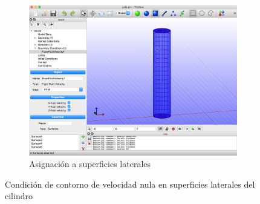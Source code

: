 \begin{figure}[!ht]
\begin{subfigure}[b]{0.48\textwidth}
\includegraphics[width=\linewidth]{figuras_4/03_pre-bc-zfv-2.png}
\caption{Asignación a superficies laterales}
\label{fig:pre-03-b}
\end{subfigure}
\caption{Condición de contorno de velocidad nula en superficies laterales del cilindro}
\label{fig:pre-03-ab}
\end{figure}

